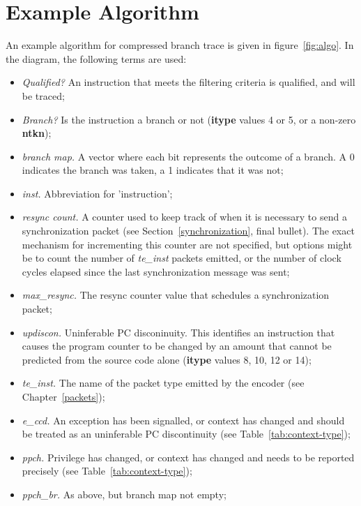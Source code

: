 \chapter{Example Algorithm} \label{Algorithm}

An example algorithm for compressed branch trace is given in figure~\ref{fig:algo}. 
In the diagram, the following terms are used:

\begin{itemize}
  \item \textit{Qualified?}  An instruction that meets the filtering criteria is qualified, and will be traced;
  \item \textit{Branch?} Is the instruction a branch or not (\textbf{itype} values 4 or 5, or a non-zero \textbf{ntkn});
  \item \textit{branch map.}  A vector where each bit represents the outcome of a branch.  A 0 indicates the
    branch was taken, a 1 indicates that it was not;
  \item \textit{inst.}  Abbreviation for 'instruction';
  \item \textit{resync count.} A counter used to keep track of when it is necessary to send 
    a synchronization packet (see Section~\ref{synchronization}, final bullet). The exact mechanism for 
    incrementing this counter are not specified, but options might be to count the number of \textit{te\_inst} packets emitted, 
    or the number of clock cycles elapsed since the last synchronization message was sent;
  \item \textit{max\_resync.}  The resync counter value that schedules a synchronization packet;
  \item \textit{updiscon.}  Uninferable PC disconinuity.  This identifies an instruction that
    causes the program counter to be changed by an amount that cannot be predicted from the
    source code alone (\textbf{itype} values 8, 10, 12 or 14);
   \item \textit{te\_inst.} The name of the packet type emitted by the encoder (see Chapter~\ref{packets});
   \item \textit{e\_ccd.} An exception has been signalled, or context has changed and
     should be treated as an uninferable PC discontinuity (see Table~\ref{tab:context-type});
   \item \textit{ppch.} Privilege has changed, or context has changed and needs to be 
     reported precisely (see Table~\ref{tab:context-type});
   \item \textit{ppch\_br.} As above, but branch map not empty;

\end{itemize}
